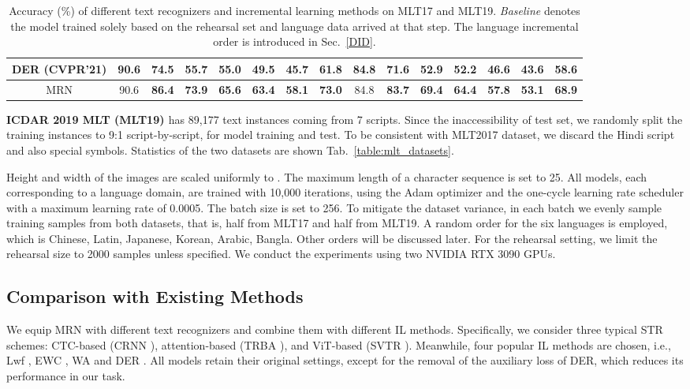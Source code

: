 \documentclass[10pt,twocolumn,letterpaper]{article}
\begin{document}
\begin{table*}[]
\begin{center}
{\begin{tabular}{ccccccccccccccc}
\multicolumn{1}{c|}{DER (CVPR'21)\cite{Yan2021DER}}      & 90.6 & 74.5          & 55.7          & 55.0          & 49.5          & 45.7          & \multicolumn{1}{c|}{61.8}          & 84.8 & 71.6          & 52.9          & 52.2          & 46.6          & 43.6          & 58.6          \\ \hline
\multicolumn{1}{c|}{MRN}     & 90.6 & \textbf{86.4} & \textbf{73.9} & \textbf{65.6} & \textbf{63.4} & \textbf{58.1} & \multicolumn{1}{c|}{\textbf{73.0}} & 84.8 & \textbf{83.7} & \textbf{69.4} & \textbf{64.4} & \textbf{57.8} & \textbf{53.1} & \textbf{68.9} \\ \hline
\end{tabular}
}
\end{center}
\caption{Accuracy (\%) of different text recognizers and incremental learning methods on MLT17 and MLT19. \emph{Baseline} denotes the model trained solely based on the rehearsal set and language data arrived at that step. The language incremental order is introduced in Sec.~\ref{DID}.
}
\label{table:sota}
\end{table*}



\noindent\textbf{ICDAR 2019 MLT (MLT19) \cite{nayef2019mlt2019}} has 89,177 text instances coming from 7 scripts. Since the inaccessibility of test set, we randomly split the training instances to 9:1 script-by-script, for model training and test. To be consistent with MLT2017 dataset, we discard the Hindi script and also special symbols. Statistics of the two datasets are shown Tab.~\ref{table:mlt_datasets}.

Height and width of the images are scaled uniformly to . The maximum length of a character sequence is set to 25. All models, each corresponding to a language domain, are trained with 10,000 iterations, using the Adam optimizer and the one-cycle learning rate scheduler \cite{smith2019super} with a maximum learning rate of 0.0005. The batch size is set to 256. To mitigate the dataset variance, in each batch we evenly sample training samples from both datasets, that is, half from MLT17 and half from MLT19. A random order for the six languages is employed, which is Chinese, Latin, Japanese, Korean, Arabic, Bangla. Other orders will be discussed later. For the rehearsal setting, we limit the rehearsal size to 2000 samples unless specified. We conduct the experiments using two NVIDIA RTX 3090 GPUs.

\subsection{Comparison with Existing Methods}
We equip MRN with different text recognizers and combine them with different IL methods. Specifically, we consider three typical STR schemes: CTC-based (CRNN \cite{ShiBY17crnn}), attention-based (TRBA \cite{Baekwhats_wrong_19ICCV}), and ViT-based (SVTR \cite{du2022@svtr}). Meanwhile, four popular IL methods are chosen, i.e., Lwf \cite{Li2017LWF}, EWC \cite{kirkpatrick2017ewc}, WA \cite{zhao2020wa} and DER \cite{Yan2021DER}. All models retain their original settings, except for the removal of the auxiliary loss of DER, which reduces its performance in our task.
\end{document}
